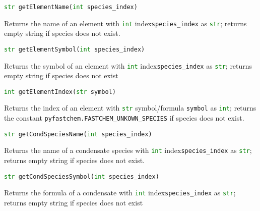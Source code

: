 \documentclass[numbers=noenddot]{aux/fcmanual}
\begin{document}
\bigbreak

\lstinline[language=Python]!str getElementName(int species_index)!
\begin{addmargin}[25pt]{0pt}
	Returns the name of an element with \lstinline[language=Python]!int! index\footnotemark[\value{footnote}] \lstinline!species_index! as \lstinline[language=Python]!str!; returns empty string if species does not exist.
\end{addmargin}  

\bigbreak

\lstinline[language=Python]!str getElementSymbol(int species_index)!
\begin{addmargin}[25pt]{0pt}
	Returns the symbol of an element with \lstinline[language=Python]!int! index\footnotemark[\value{footnote}] \lstinline!species_index! as \lstinline[language=Python]!str!; returns empty string if species does not exist
\end{addmargin}

\bigbreak

\lstinline[language=Python]!int getElementIndex(str symbol)!
\begin{addmargin}[25pt]{0pt}
	Returns the index of an element with \lstinline[language=Python]!str! symbol/formula \lstinline!symbol! as \lstinline[language=Python]!int!; returns the constant \lstinline!pyfastchem.FASTCHEM_UNKOWN_SPECIES! if species does not exist.
\end{addmargin}

\bigbreak

\lstinline[language=Python]!str getCondSpeciesName(int species_index)!
\begin{addmargin}[25pt]{0pt}
	Returns the name of a condensate species with \lstinline[language=Python]!int! index\footnotemark[\value{footnote}] \lstinline!species_index! as \lstinline[language=Python]!str!; returns empty string if species does not exist.
\end{addmargin}  

\bigbreak

\lstinline[language=Python]!str getCondSpeciesSymbol(int species_index)!
\begin{addmargin}[25pt]{0pt}
	Returns the formula of a condensate with \lstinline[language=Python]!int! index\footnotemark[\value{footnote}] \lstinline!species_index! as \lstinline[language=Python]!str!; returns empty string if species does not exist
\end{addmargin}

\bigbreak
\end{document}
